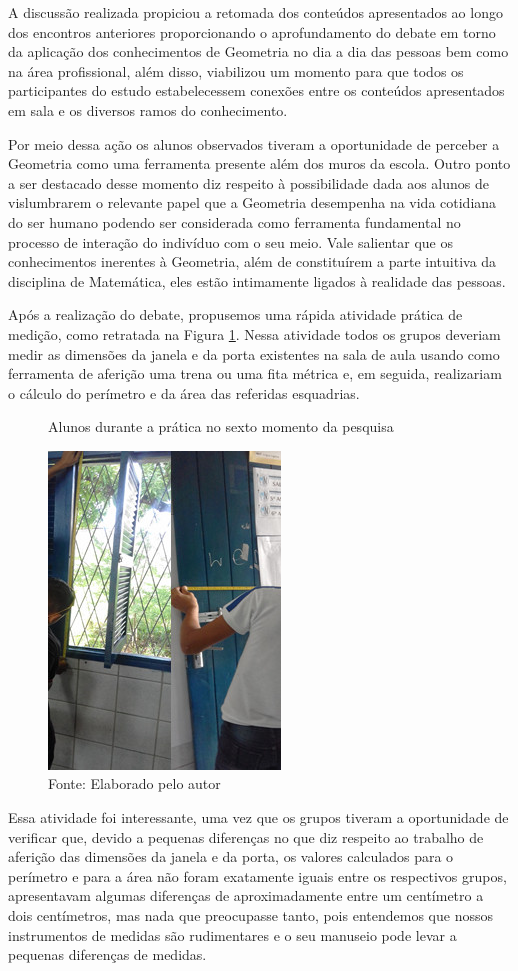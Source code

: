 \begin{refsection}
    A discussão realizada propiciou a retomada dos conteúdos apresentados ao longo dos encontros anteriores proporcionando o aprofundamento do debate em torno da aplicação dos conhecimentos de Geometria no dia a dia das pessoas bem como na área profissional, além disso, viabilizou um momento para que todos os participantes do estudo estabelecessem conexões entre os conteúdos apresentados em sala e os diversos ramos do conhecimento.  

    Por meio dessa ação os alunos observados tiveram a oportunidade de perceber a Geometria como uma ferramenta presente além dos muros da escola. Outro ponto a ser destacado desse momento diz respeito à possibilidade dada aos alunos de vislumbrarem o relevante papel que a Geometria desempenha na vida cotidiana do ser humano podendo ser considerada como ferramenta fundamental no processo de interação do indivíduo com o seu meio. Vale salientar que os conhecimentos inerentes à Geometria, além de constituírem a parte intuitiva da disciplina de Matemática, eles estão intimamente ligados à realidade das pessoas. 

    Após a realização do debate, propusemos uma rápida atividade prática de medição, como retratada na Figura \ref{fig:alunos-durante-6a-pratica}. Nessa atividade todos os grupos deveriam medir as dimensões da janela e da porta existentes na sala de aula usando como ferramenta de aferição uma trena ou uma fita métrica e, em seguida, realizariam o cálculo do perímetro e da área das referidas esquadrias.  

    \begin{figure}[ht]%
        \centering%
        \caption{Alunos durante a prática no sexto momento da pesquisa}%
        \includegraphics[width=.25\textwidth]{articles/04-matematica-na-arte--/figura9.jpg}%
        \caption*{Fonte: Elaborado pelo autor}%
        \label{fig:alunos-durante-6a-pratica}%
    \end{figure}%

    Essa atividade foi interessante, uma vez que os grupos tiveram a oportunidade de verificar que, devido a pequenas diferenças no que diz respeito ao trabalho de aferição das dimensões da janela e da porta, os valores calculados para o perímetro e para a área não foram exatamente iguais entre os respectivos grupos, apresentavam algumas diferenças de aproximadamente entre um centímetro a dois centímetros, mas nada que preocupasse tanto, pois entendemos que nossos instrumentos de medidas são rudimentares e o seu manuseio pode levar a pequenas diferenças de medidas. 


\end{refsection}
